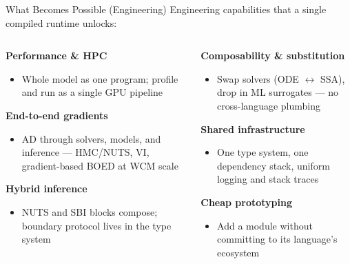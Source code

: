 \documentclass[aspectratio=169]{beamer}
\begin{document}
\begin{frame}{What Becomes Possible (Engineering)}
	\small
	Engineering capabilities that a single compiled runtime unlocks:

	\medskip
	\begin{columns}[T]
		\begin{column}{0.48\textwidth}
			\textbf{Performance \& HPC}
			\begin{itemize}\itemsep0pt\parskip0pt
				\item Whole model as one program; profile and run as a single GPU pipeline
			\end{itemize}

			\medskip
			\textbf{End-to-end gradients}
			\begin{itemize}\itemsep0pt\parskip0pt
				\item AD through solvers, models, and inference --- HMC/NUTS, VI, gradient-based BOED at WCM scale
			\end{itemize}

			\medskip
			\textbf{Hybrid inference}
			\begin{itemize}\itemsep0pt\parskip0pt
				\item NUTS and SBI blocks compose; boundary protocol lives in the type system
			\end{itemize}
		\end{column}
		\begin{column}{0.48\textwidth}
			\textbf{Composability \& substitution}
			\begin{itemize}\itemsep0pt\parskip0pt
				\item Swap solvers (ODE $\leftrightarrow$ SSA), drop in ML surrogates --- no cross-language plumbing
			\end{itemize}

			\medskip
			\textbf{Shared infrastructure}
			\begin{itemize}\itemsep0pt\parskip0pt
				\item One type system, one dependency stack, uniform logging and stack traces
			\end{itemize}

			\medskip
			\textbf{Cheap prototyping}
			\begin{itemize}\itemsep0pt\parskip0pt
				\item Add a module without committing to its language's ecosystem
			\end{itemize}
		\end{column}
	\end{columns}
\end{frame}
\end{document}
